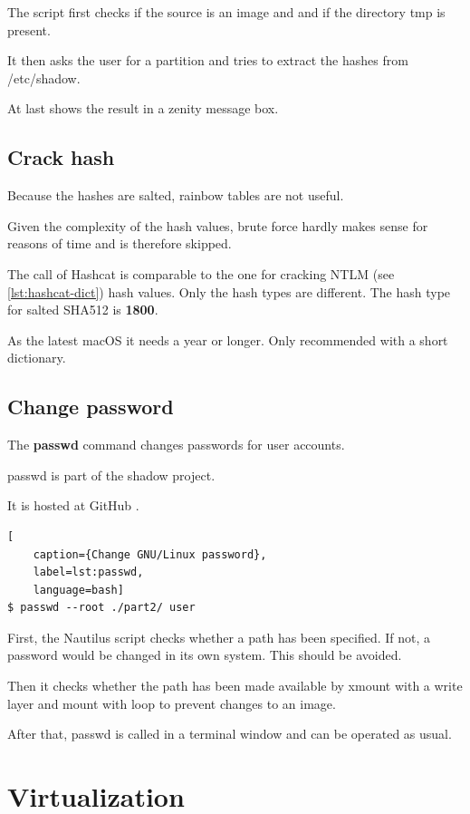 \noindent The script first checks if the source is an image and and if the directory tmp is present.

It then asks the user for a partition and tries to extract the hashes from /etc/shadow.

At last shows the result in a zenity message box.

\subsection{Crack hash}

Because the hashes are salted, rainbow tables are not useful.

Given the complexity of the hash values, brute force hardly makes sense for reasons of time and is therefore skipped.

The call of Hashcat is comparable to the one for cracking NTLM (see \cref{lst:hashcat-dict}) hash values. Only the hash types are different. The hash type for salted SHA512 is \textbf{1800}.

As the latest macOS it needs a year or longer. Only recommended with a short dictionary.

\subsection{Change password}

The \textbf{passwd} command changes passwords for user accounts.

passwd is part of the shadow project.

It is hosted at GitHub \cite{Shadow}.

\begin{lstlisting}[
    caption={Change GNU/Linux password},
    label=lst:passwd,
    language=bash]
$ passwd --root ./part2/ user
\end{lstlisting}

\noindent First, the Nautilus script checks whether a path has been specified. If not, a password would be changed in its own system. This should be avoided.

Then it checks whether the path has been made available by xmount with a write layer and mount with loop to prevent changes to an image.

After that, passwd is called in a terminal window and can be operated as usual.

\section{Virtualization}

